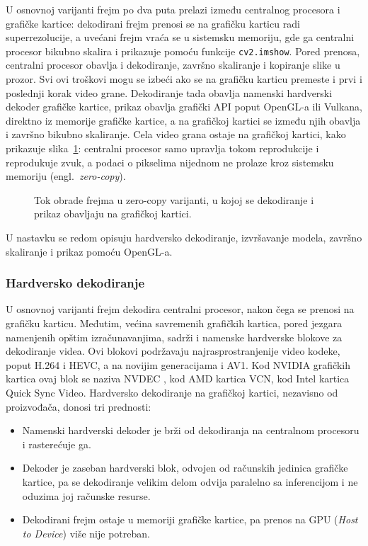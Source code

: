\documentclass[12pt,a4paper]{article}
\begin{document}
U osnovnoj varijanti frejm po dva puta prelazi između centralnog procesora i grafičke kartice: dekodirani frejm prenosi se na grafičku karticu radi superrezolucije, a uvećani frejm vraća se u sistemsku memoriju, gde ga centralni procesor bikubno skalira i prikazuje pomoću funkcije \texttt{cv2.imshow}. Pored prenosa, centralni procesor obavlja i dekodiranje, završno skaliranje i kopiranje slike u prozor. Svi ovi troškovi mogu se izbeći ako se na grafičku karticu premeste i prvi i poslednji korak video grane. Dekodiranje tada obavlja namenski hardverski dekoder grafičke kartice, prikaz obavlja grafički API poput OpenGL-a ili Vulkana, direktno iz memorije grafičke kartice, a na grafičkoj kartici se između njih obavlja i završno bikubno skaliranje. Cela video grana ostaje na grafičkoj kartici, kako prikazuje slika~\ref{fig:plejer_tok_gpu}: centralni procesor samo upravlja tokom reprodukcije i reprodukuje zvuk, a podaci o pikselima nijednom ne prolaze kroz sistemsku memoriju (engl.\ \textit{zero-copy}).

\begin{figure}[H]
	\centering
	
	\caption{Tok obrade frejma u zero-copy varijanti, u kojoj se dekodiranje i prikaz obavljaju na grafičkoj kartici.}
	\label{fig:plejer_tok_gpu}
\end{figure}

U nastavku se redom opisuju hardversko dekodiranje, izvršavanje modela, završno skaliranje i prikaz pomoću OpenGL-a.

\subsubsection{Hardversko dekodiranje}
\label{sec:gpu_dekodiranje}

U osnovnoj varijanti frejm dekodira centralni procesor, nakon čega se prenosi na grafičku karticu. Međutim, većina savremenih grafičkih kartica, pored jezgara namenjenih opštim izračunavanjima, sadrži i namenske hardverske blokove za dekodiranje videa. Ovi blokovi podržavaju najrasprostranjenije video kodeke, poput H.264 i HEVC, a na novijim generacijama i AV1. Kod NVIDIA grafičkih kartica ovaj blok se naziva NVDEC \cite{NVCodecSDK}, kod AMD kartica VCN, kod Intel kartica Quick Sync Video. Hardversko dekodiranje na grafičkoj kartici, nezavisno od proizvođača, donosi tri prednosti:
\begin{itemize}[itemsep=0pt]
	\item Namenski hardverski dekoder je brži od dekodiranja na centralnom procesoru i rasterećuje ga.
	\item Dekoder je zaseban hardverski blok, odvojen od računskih jedinica grafičke kartice, pa se dekodiranje velikim delom odvija paralelno sa inferencijom i ne oduzima joj računske resurse.
	\item Dekodirani frejm ostaje u memoriji grafičke kartice, pa prenos na GPU (\textit{Host to Device}) više nije potreban.
\end{itemize}
\end{document}
